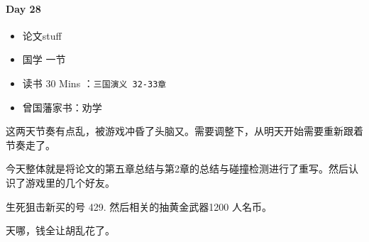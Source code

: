 \documentclass[UTF8,a4paper,8pt]{ctexart}
\begin{document}
 	 \paragraph{Day 28      \quad     }
	 	 \begin{itemize}[itemindent = 1em]
	 	 	\renewcommand\labelitemi{\makebox[0pt][l]{$\square$}\raisebox{.15ex}{\hspace{0.1em}$\checkmark$}}		
	 	 	
	 	 	\item     论文stuff
	 	 	
	 	 	
	 	 	\renewcommand\labelitemi{\makebox[0pt][l]{$\square$}\hspace{1em}}
	 	 	\item   国学  一节
	 	 	\item   读书  30 Mins	：\verb|三国演义 32-33章|
	 	 	\item   曾国藩家书：劝学
	 	 \end{itemize}
	 	 这两天节奏有点乱，被游戏冲昏了头脑又。需要调整下，从明天开始需要重新跟着节奏走了。
	 	 
	 	 今天整体就是将论文的第五章总结与第2章的总结与碰撞检测进行了重写。然后认识了游戏里的几个好友。
	 	 
	 	 生死狙击新买的号 429. 然后相关的抽黄金武器1200 人名币。
	 	 
	 	 天哪，钱全让胡乱花了。
\end{document}

